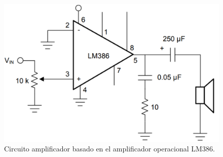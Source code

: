 \begin{figure}[h]
	\centering
	\includegraphics[scale=.35]{./Figures/amplificadorLM386.pdf}
	\caption{Circuito amplificador basado en el amplificador operacional LM386.}
	\label{fig:amplificadorLM386}
\end{figure}